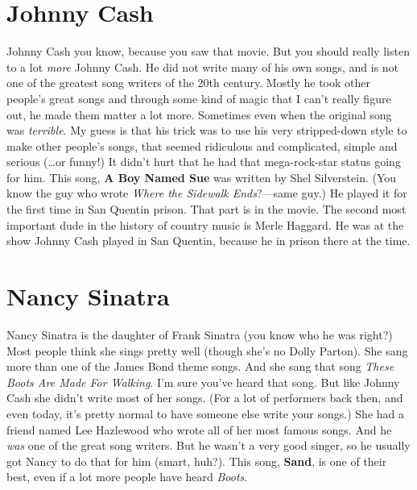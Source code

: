 \documentclass[letterpaper,single]{article}
\begin{document}
\section{Johnny Cash}
Johnny Cash you know, because you saw that movie.
But you should really listen to a lot \emph{more} Johnny Cash. 
He did not write many of his own songs, and is not one of the greatest song writers of the 20th century. 
Mostly he took other people's great songs and through some kind of magic that I can't really figure out, he made them matter a lot more.
Sometimes even when the original song was \emph{terrible}. 
My guess is that his trick was to use his very stripped-down style to make other people's songs, that seemed ridiculous and complicated, simple and serious (\ldots or funny!)
It didn't hurt that he had that mega-rock-star status going for him.
This song, \textbf{A Boy Named Sue} was written by Shel Silverstein. 
(You know the guy who wrote \emph{Where the Sidewalk Ends}?---same guy.) 
He played it for the first time in San Quentin prison. 
That part is in the movie.
The second most important dude in the history of country music is Merle Haggard. He was at the show Johnny Cash played in San Quentin, because he in prison there at the time.

\section{Nancy Sinatra}
Nancy Sinatra is the daughter of Frank Sinatra (you know who he was right?) 
Most people think she sings pretty well (though she's no Dolly Parton). 
She sang more than one of the James Bond theme songs. 
And she sang that song \emph{These Boots Are Made For Walking}. 
I'm sure you've heard that song. 
But like Johnny Cash she didn't write most of her songs. 
(For a lot of performers back then, and even today, it's pretty normal to have someone else write your songs.)
She had a friend named Lee Hazlewood who wrote all of her most famous songs. 
And he \emph{was} one of the great song writers. 
But he wasn't a very good singer, so he usually got Nancy to do that for him (smart, huh?). 
This song, \textbf{Sand}, is one of their best, even if a lot more people have heard \emph{Boots}.
\end{document}
